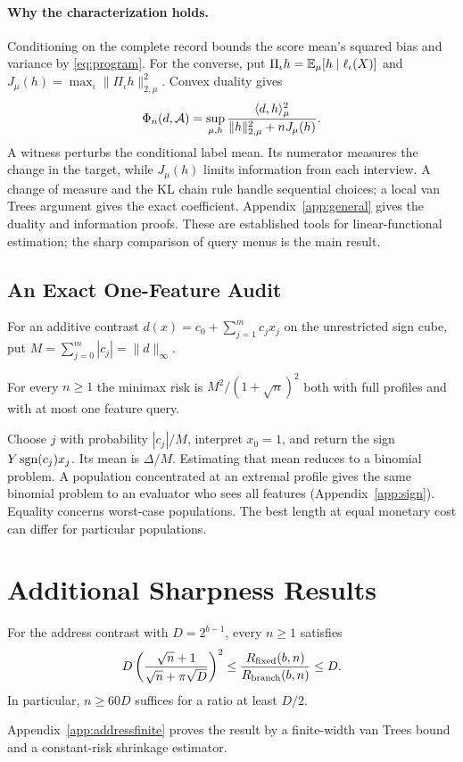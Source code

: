 \paragraph{Why the characterization holds.}
Conditioning on the complete record bounds the score mean's squared bias and variance by \eqref{eq:program}. For the converse, put $\Pi_\iota h=\mathbb{E}_\mu[h\mid\ell_\iota(X)]$ and $J_\mu(h)=\max_\iota\|\Pi_\iota h\|_{2,\mu}^2$. Convex duality gives
\begin{equation}
 \Phi_n(d,\mathcal A)=\sup_{\mu,h}
 \frac{\langle d,h\rangle_\mu^2}{\|h\|_{2,\mu}^2+nJ_\mu(h)}.\label{eq:dual}
\end{equation}
A witness perturbs the conditional label mean. Its numerator measures the change in the target, while $J_\mu(h)$ limits information from each interview. A change of measure and the KL chain rule handle sequential choices; a local van Trees argument gives the exact coefficient. Appendix~\ref{app:general} gives the duality and information proofs. These are established tools for linear-functional estimation; the sharp comparison of query menus is the main result.

\subsection{An Exact One-Feature Audit}
For an additive contrast $d(x)=c_0+\sum_{j=1}^m c_j x_j$ on the unrestricted sign cube, put $M=\sum_{j=0}^m |c_j|=\|d\|_\infty$.
\begin{proposition}\label{prop:add}
For every $n\ge1$ the minimax risk is $M^2/(1+\sqrt n)^2$ both with full profiles and with at most one feature query.
\end{proposition}
Choose $j$ with probability $|c_j|/M$, interpret $x_0=1$, and return the sign $Y\operatorname{sgn}(c_j)x_j$. Its mean is $\Delta/M$. Estimating that mean reduces to a binomial problem. A population concentrated at an extremal profile gives the same binomial problem to an evaluator who sees all features (Appendix~\ref{app:sign}). Equality concerns worst-case populations. The best length at equal monetary cost can differ for particular populations.


\section{Additional Sharpness Results}
\begin{proposition}\label{prop:finiteaddress}
For the address contrast with $D=2^{b-1}$, every $n\ge1$ satisfies
\[
 D\left(\frac{\sqrt n+1}{\sqrt n+\pi\sqrt D}\right)^2
 \le\frac{R_{\rm fixed}(b,n)}{R_{\rm branch}(b,n)}\le D.
\]
In particular, $n\ge60D$ suffices for a ratio at least $D/2$.
\end{proposition}
Appendix~\ref{app:addressfinite} proves the result by a finite-width van Trees bound and a constant-risk shrinkage estimator.

